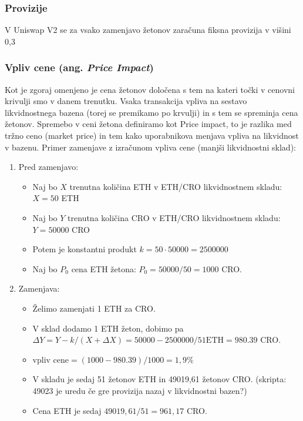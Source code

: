 \documentclass[a4paper,12pt]{article}%
\begin{document}
\subsubsection{ Provizije}
V Uniswap V2 se za vsako zamenjavo žetonov zaračuna fiksna provizija v višini 0,3 %

\subsubsection{Vpliv cene (ang. \textit{Price Impact})}

Kot je zgoraj omenjeno je cena žetonov določena s tem na kateri točki v cenovni krivulji smo v danem trenutku. Vsaka transakcija vpliva na sestavo likvidnostnega bazena (torej se premikamo po krvulji) in s tem se spreminja cena žetonov. Spremebo v ceni žetona definiramo kot Price impact, to je razlika med tržno ceno (market price) in tem kako uporabnikova menjava vpliva na likvidnost v bazenu. 
\newline
Primer zamenjave z izračunom vpliva cene (manjši likvidnostni sklad):
\begin{enumerate}
    \item Pred zamenjavo:
    \begin{itemize}
        \item Naj bo $X$ trenutna količina ETH v ETH/CRO likvidnostnem skladu: $X = 50$ ETH
        \item Naj bo $Y$ trenutna količina CRO v ETH/CRO likvidnostnem skladu: $Y = 50 000$ CRO 
        \item Potem je konstantni produkt $k = 50 \cdot 50 000 = 2 500 000$
        \item Naj bo $P_0$ cena ETH žetona: $P_0 = 50000/50 = 1000$ CRO. 
    \end{itemize}
    \item Zamenjava: 
    \begin{itemize}
        \item Želimo zamenjati 1 ETH za CRO.
        \item V sklad dodamo 1 ETH žeton, dobimo pa $\Delta Y = Y - k/(X+\Delta X) = 50 000 - 2 500 000/{51 \text{ETH}} = 980.39$ CRO.
        \item $\text{vpliv cene} = (1000 - 980.39)/1000 =  1,9 \%  $   
        \item V skladu je sedaj 51 žetonov ETH in 49019,61 žetonov CRO.   (skripta:  49023 je uredu če gre provizija nazaj v likvidnostni bazen?)
        \item Cena ETH je sedaj $49019,61/51 = 961,17$ CRO.
    \end{itemize}
\end{enumerate}
\end{document}
